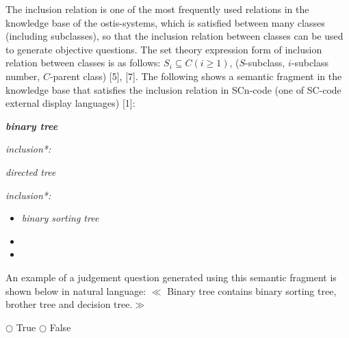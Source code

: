 \documentclass{article}
\begin{document}
\begin{multicols}{2}
The inclusion relation is one of the most frequently used relations in the knowledge base of the ostis-systems, which is satisfied between many classes (including subclasses), so that the inclusion relation between classes can be used to generate objective questions. The set theory expression form of inclusion relation between classes is as follows: $S_i \subseteq C(i\geq1)$, ($S$-subclass, $i$-subclass number, $C$-parent class) [5], [7]. The following shows a semantic fragment in the knowledge base that satisfies the inclusion relation in SCn-code (one of SC-code external display languages) [1]:

\noindent\textbf{\textit{binary tree}}
  \vspace{-0.3cm}
    \begin{description}[ labelwidth=0.75cm, itemsep=-1.5mm]
        \item[$\Leftarrow$] \textit{inclusion*:} \\
        \vspace{-0.3cm}
            \item[]
           \begin{description}[leftmargin=0mm] \textit{directed tree}
            \end{description}
    \end{description}
    \vspace{-0.6cm}
    \begin{description} [ labelwidth=0.75cm, itemsep=-1.5mm]
        \item[$\Rightarrow$] \textit{inclusion*:}
        \begin{itemize}
        \item \hspace{5mm}\textit{binary sorting tree}
        \item \hspace{5mm}{brother tree}
        \item \hspace{5mm}{decision tree}
        \end{itemize}
    \end{description}
    
    An example of a judgement question generated using
this semantic fragment is shown below in natural language: $\ll$ Binary tree contains binary sorting tree, brother tree
and decision tree.$\gg$

$\bigcirc$ True \hspace{5mm} $\bigcirc$ False


\end{multicols}
\end{document}
